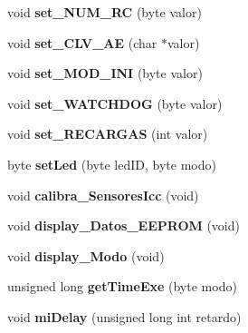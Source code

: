 \begin{DoxyCompactItemize}
\item 
void {\bfseries set\+\_\+\+N\+U\+M\+\_\+\+RC} (byte valor)\hypertarget{class_u_f___s_y_s_afee4a85c55c6e8f26811d94415032df1}{}\label{class_u_f___s_y_s_afee4a85c55c6e8f26811d94415032df1}

\item 
void {\bfseries set\+\_\+\+C\+L\+V\+\_\+\+AE} (char $\ast$valor)\hypertarget{class_u_f___s_y_s_aa6d62b10413da68fc8c83705080a3a67}{}\label{class_u_f___s_y_s_aa6d62b10413da68fc8c83705080a3a67}

\item 
void {\bfseries set\+\_\+\+M\+O\+D\+\_\+\+I\+NI} (byte valor)\hypertarget{class_u_f___s_y_s_a5b1dd3455e5fbb4ac6bfcdaf576b8be1}{}\label{class_u_f___s_y_s_a5b1dd3455e5fbb4ac6bfcdaf576b8be1}

\item 
void {\bfseries set\+\_\+\+W\+A\+T\+C\+H\+D\+OG} (byte valor)\hypertarget{class_u_f___s_y_s_aebe03289374de64f0d64a487dc2e8126}{}\label{class_u_f___s_y_s_aebe03289374de64f0d64a487dc2e8126}

\item 
void {\bfseries set\+\_\+\+R\+E\+C\+A\+R\+G\+AS} (int valor)\hypertarget{class_u_f___s_y_s_a0c6e95fdc30b8e3ac8ca99a16a9a0449}{}\label{class_u_f___s_y_s_a0c6e95fdc30b8e3ac8ca99a16a9a0449}

\item 
byte {\bfseries set\+Led} (byte led\+ID, byte modo)\hypertarget{class_u_f___s_y_s_a24b3f084cb65d1e0db54efb1d2351d17}{}\label{class_u_f___s_y_s_a24b3f084cb65d1e0db54efb1d2351d17}

\item 
void {\bfseries calibra\+\_\+\+Sensores\+Icc} (void)\hypertarget{class_u_f___s_y_s_a36030a447cea04bc1ef0ab17b33af528}{}\label{class_u_f___s_y_s_a36030a447cea04bc1ef0ab17b33af528}

\item 
void {\bfseries display\+\_\+\+Datos\+\_\+\+E\+E\+P\+R\+OM} (void)\hypertarget{class_u_f___s_y_s_a1c2d0e47a0a1e3738d1dc8fd9af8e032}{}\label{class_u_f___s_y_s_a1c2d0e47a0a1e3738d1dc8fd9af8e032}

\item 
void {\bfseries display\+\_\+\+Modo} (void)\hypertarget{class_u_f___s_y_s_ac69b264d987b2189860f9e1e62b7f9d8}{}\label{class_u_f___s_y_s_ac69b264d987b2189860f9e1e62b7f9d8}

\item 
unsigned long {\bfseries get\+Time\+Exe} (byte modo)\hypertarget{class_u_f___s_y_s_aff003debfb3ca4b78cf2e6a72bb74631}{}\label{class_u_f___s_y_s_aff003debfb3ca4b78cf2e6a72bb74631}

\item 
void {\bfseries mi\+Delay} (unsigned long int retardo)\hypertarget{class_u_f___s_y_s_a346e6f09f0fa343e9702a43e2d651b6d}{}\label{class_u_f___s_y_s_a346e6f09f0fa343e9702a43e2d651b6d}

\end{DoxyCompactItemize}


